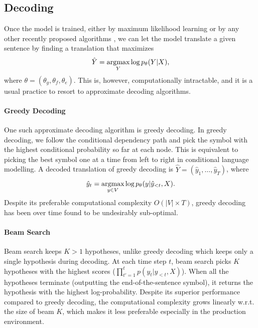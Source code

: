 \subsection{Decoding}

Once the model is trained, either by maximum likelihood learning or by any other recently proposed algorithms \citep{wiseman2016sequence,shen2015minimum,bahdanau2016actor,ranzato2015sequence}, we can let the model translate a given sentence by finding a translation that maximizes 
\begin{align*}
\hat{Y} = \mathop{\text{argmax}}_{Y} \log p_{\theta} (Y|X),
\end{align*}
where $\theta=(\theta_g, \theta_f, \theta_e)$.
This is, however, computationally intractable, and it is a usual practice to resort to approximate decoding algorithms.

\paragraph{Greedy Decoding}

One such approximate decoding algorithm is greedy decoding. In greedy decoding, we follow the conditional dependency path and pick the symbol with the highest conditional probability so far at each node. This is equivalent to picking the best symbol one at a time from left to right in conditional language modelling. A decoded translation of greedy decoding is $\hat{Y} = (\hat{y}_1, \ldots, \hat{y}_T)$, where
\begin{equation}
\hat{y}_t =  \mathop{\text{argmax}}_{y \in V} \log p_{\theta}(y|\hat{y}_{<t}, X).
\end{equation}
Despite its preferable computational complexity $O(|V| \times T)$, greedy decoding has been over time found to be undesirably sub-optimal.%

\paragraph{Beam Search}  

Beam search keeps $K > 1$ hypotheses, unlike greedy decoding which keeps only a single hypothesis during decoding. At each time step $t$, beam search picks $K$ hypotheses with the highest scores ($\prod_{t'=1}^t p(y_t | y_{<t}, X)$). When all the hypotheses terminate (outputting the end-of-the-sentence symbol), it returns the hypothesis with the highest log-probability. Despite its superior performance compared to greedy decoding, the computational complexity grows linearly w.r.t. the size of beam $K$, which makes it less preferable especially in the production environment.



